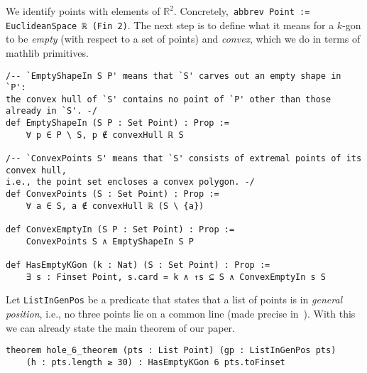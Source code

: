 We identify points with elements of $\mathbb{R}^2$. Concretely,~\lstinline|abbrev Point := EuclideanSpace ℝ (Fin 2)|.
The next step is to define what it means for a $k$-gon to be \emph{empty} (with respect to a set of points) and \emph{convex}, which we do in terms of \textsf{mathlib} primitives.

\begin{lstlisting}
/-- `EmptyShapeIn S P' means that `S' carves out an empty shape in `P':
the convex hull of `S' contains no point of `P' other than those already in `S'. -/
def EmptyShapeIn (S P : Set Point) : Prop :=
    ∀ p ∈ P \ S, p ∉ convexHull ℝ S

/-- `ConvexPoints S' means that `S' consists of extremal points of its convex hull,
i.e., the point set encloses a convex polygon. -/
def ConvexPoints (S : Set Point) : Prop :=
    ∀ a ∈ S, a ∉ convexHull ℝ (S \ {a})

def ConvexEmptyIn (S P : Set Point) : Prop :=
    ConvexPoints S ∧ EmptyShapeIn S P

def HasEmptyKGon (k : Nat) (S : Set Point) : Prop :=
    ∃ s : Finset Point, s.card = k ∧ ↑s ⊆ S ∧ ConvexEmptyIn s S
\end{lstlisting}

Let \lstinline|ListInGenPos| be a predicate that states that a list of points is in \emph{general position}, i.e., no three points lie on a common line (made precise in~).
With this we can already state the main theorem of our paper.

\begin{lstlisting}
theorem hole_6_theorem (pts : List Point) (gp : ListInGenPos pts)
    (h : pts.length ≥ 30) : HasEmptyKGon 6 pts.toFinset
\end{lstlisting}

